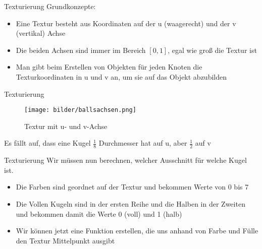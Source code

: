 \begin{frame}{Texturierung}
Grundkonzepte:
\begin{itemize}
	\item Eine Textur besteht aus Koordinaten auf der u (waagerecht) und der v (vertikal) Achse
	\item Die beiden Achsen sind immer im Bereich $[0,1]$, egal wie groß die Textur ist
	\item Man gibt beim Erstellen von Objekten für jeden Knoten die Texturkoordinaten in u und v an, um sie auf das Objekt abzubilden
\end{itemize}
\end{frame}
\begin{frame}{Texturierung}
\begin{figure}
	\caption{Textur mit u- und v-Achse}
	\texttt{[image: bilder/ballsachsen.png]}
\end{figure}
Es fällt auf, dass eine Kugel $\frac{1}{8}$ Durchmesser hat auf u, aber $\frac{1}{2}$ auf v
\end{frame}
\begin{frame}{Texturierung}
Wir müssen nun berechnen, welcher Ausschnitt für welche Kugel ist.
	\begin{itemize}
		\item Die Farben sind geordnet auf der Textur und bekommen Werte von 0 bis 7
		\item Die Vollen Kugeln sind in der ersten Reihe und die Halben in der Zweiten und bekommen damit die Werte 0 (voll) und 1 (halb)
		\item Wir können jetzt eine Funktion erstellen, die uns anhand von Farbe und Fülle den Textur Mittelpunkt ausgibt 
	\end{itemize}
\end{frame}

